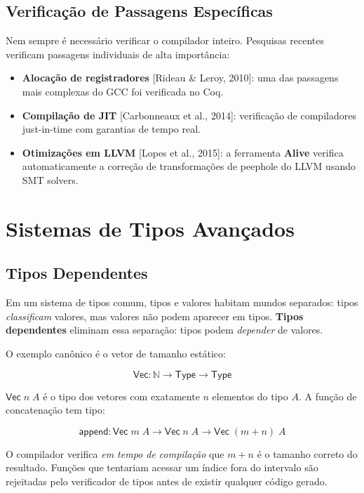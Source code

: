 \subsection{Verificação de Passagens Específicas}

Nem sempre é necessário verificar o compilador inteiro. Pesquisas
recentes verificam passagens individuais de alta importância:

\begin{itemize}
  \item \textbf{Alocação de registradores} [Rideau \& Leroy, 2010]:
    uma das passagens mais complexas do GCC foi verificada no Coq.
  \item \textbf{Compilação de JIT} [Carbonneaux et al., 2014]:
    verificação de compiladores just-in-time com garantias de tempo real.
  \item \textbf{Otimizações em LLVM} [Lopes et al., 2015]: a ferramenta
    \textbf{Alive} verifica automaticamente a correção de transformações
    de peephole do LLVM usando SMT solvers.
\end{itemize}

\section{Sistemas de Tipos Avançados}

\subsection{Tipos Dependentes}

Em um sistema de tipos comum, tipos e valores habitam mundos separados:
tipos \emph{classificam} valores, mas valores não podem aparecer em
tipos. \textbf{Tipos dependentes} eliminam essa separação: tipos podem
\emph{depender} de valores.

O exemplo canônico é o vetor de tamanho estático:

\[
\mathsf{Vec} : \mathbb{N} \to \mathsf{Type} \to \mathsf{Type}
\]

\(\mathsf{Vec}\; n\; A\) é o tipo dos vetores com exatamente \(n\)
elementos do tipo \(A\). A função de concatenação tem tipo:

\[
\mathsf{append} : \mathsf{Vec}\; m\; A \to \mathsf{Vec}\; n\; A \to \mathsf{Vec}\; (m + n)\; A
\]

O compilador verifica \emph{em tempo de compilação} que \(m + n\) é o
tamanho correto do resultado. Funções que tentariam acessar um índice
fora do intervalo são rejeitadas pelo verificador de tipos antes de
existir qualquer código gerado.

